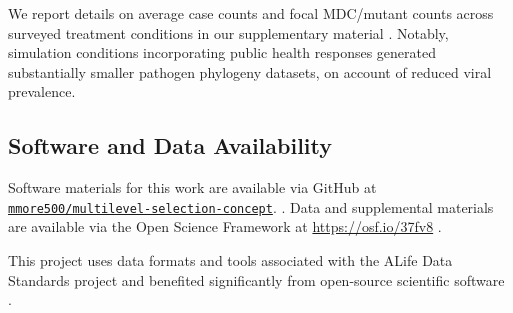 

We report details on average case counts and focal MDC/mutant counts across surveyed treatment conditions in our supplementary material \citep{ExtendingPhylogenybasedMethod2025}.
Notably, simulation conditions incorporating public health responses generated substantially smaller pathogen phylogeny datasets, on account of reduced viral prevalence.

\subsection{Software and Data Availability} \label{sec:materials}

Software materials for this work are available via GitHub at \href{https://github.com/mmore500/multilevel-selection-concept}{\texttt{mmore500/multilevel-selection-concept}}. \citep{matthew_andres_moreno_2025_15549530}.
Data and supplemental materials are available via the Open Science Framework at \url{https://osf.io/37fv8} \citep{ExtendingPhylogenybasedMethod2025,foster2017open}.

This project uses data formats and tools associated with the ALife Data Standards project \citep{lalejini2019data} and benefited significantly from open-source scientific software \citep{2020SciPy-NMeth,harris2020array,reback2020pandas,mckinney-proc-scipy-2010,waskom2021seaborn,hunter2007matplotlib,moreno2023teeplot,moreno2022hstrat,kerr2021covasim,dolson2024phylotrack,franceschi2024mlscluster,huertacepas2016ete3,moreno2024apc,lam2015numba,moreno2024dendropy,cock2009biopython,demaio2022phastsim}.

